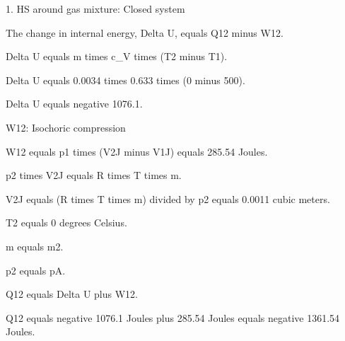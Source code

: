 1. HS around gas mixture: Closed system

The change in internal energy, Delta U, equals Q12 minus W12.

Delta U equals m times c_V times (T2 minus T1).

Delta U equals 0.0034 times 0.633 times (0 minus 500).

Delta U equals negative 1076.1.

W12: Isochoric compression

W12 equals p1 times (V2J minus V1J) equals 285.54 Joules.

p2 times V2J equals R times T times m.

V2J equals (R times T times m) divided by p2 equals 0.0011 cubic meters.

T2 equals 0 degrees Celsius.

m equals m2.

p2 equals pA.

Q12 equals Delta U plus W12.

Q12 equals negative 1076.1 Joules plus 285.54 Joules equals negative 1361.54 Joules.